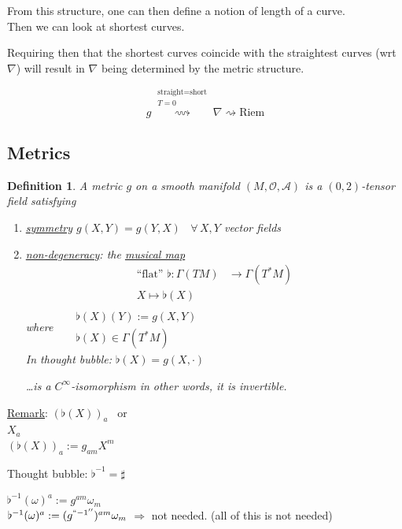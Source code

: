 \documentclass[10pt]{amsart}
\newtheorem{definition}{Definition}
\begin{document}
\begin{multicols*}{2}
	From this structure, one can then define a notion of length of a curve. \\
	Then we can look at shortest curves.
	
	Requiring then that the shortest curves coincide with the straightest curves (wrt $\nabla$) will result in $\nabla$ being determined by the metric structure.  
	
	\[
	g  \overset{ \substack{ \text{straight} = \text{short} \\ T =0 }  }{ \rightsquigarrow }  \nabla \rightsquigarrow \text{Riem}
	\]
	
	
	\subsection{Metrics}
	
	\begin{definition}
		A metric $g$ on a smooth manifold $(M,\mathcal{O}, \mathcal{A})$ is a $(0,2)$-tensor field satisfying
		\begin{enumerate}
			\item[(i)] \underline{symmetry} $g(X,Y) = g(Y,X)$ \, $\forall \, X, Y$ vector fields
			\item[(ii)] \underline{non-degeneracy}: the \underline{musical map} 
			\[
			\begin{aligned}
			\text{``flat''} \, \,  \flat : \Gamma(TM) & \to \Gamma(T^*M) \\ 
			X \mapsto \flat(X)
			\end{aligned}
			\]
			\emph{where} \quad \,  $\begin{aligned} & \quad \quad \\ 
			& \flat(X)(Y):= g(X,Y) \\
			& \flat(X) \in \Gamma(T^*M) \end{aligned}$ \\
			In thought bubble: $\flat(X) = g(X,\cdot)$
			
			\dots is a $C^{\infty}$-isomorphism in other words, it is invertible.  
			
			
		\end{enumerate}
	\end{definition}
	
	\underline{Remark}: $(\flat(X))_a$ \quad \, or \\
	$X_a$ \\
	$(\flat(X))_a := g_{am} X^m$
	
	Thought bubble: $\flat^{-1} = \sharp$
	
	$\flat^{-1}(\omega)^a := g^{am}\omega_m$ \\
	$\flat^{-1}(\omega)^a := (g^{``-1''})^{am}\omega_m$
	$\Longrightarrow $ not needed.  (all of this is not needed)
	

\end{multicols*}
\end{document}
